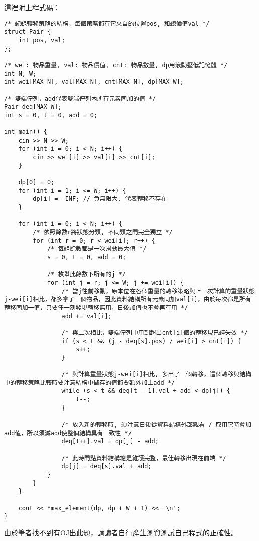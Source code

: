 這裡附上程式碼：
\begin{lstlisting}[caption=多重背包的程式碼]
/* 紀錄轉移策略的結構，每個策略都有它來自的位置pos, 和總價值val */
struct Pair {
	int pos, val;
};

/* wei: 物品重量, val: 物品價值, cnt: 物品數量, dp用滾動壓低記憶體 */
int N, W;
int wei[MAX_N], val[MAX_N], cnt[MAX_N], dp[MAX_W];

/* 雙端佇列，add代表雙端佇列內所有元素同加的值 */
Pair deq[MAX_W];
int s = 0, t = 0, add = 0;

int main() {
	cin >> N >> W;
	for (int i = 0; i < N; i++) {
		cin >> wei[i] >> val[i] >> cnt[i];
	}

	dp[0] = 0;
	for (int i = 1; i <= W; i++) {
		dp[i] = -INF; // 負無限大, 代表轉移不存在
	}

	for (int i = 0; i < N; i++) {
		/* 依照餘數r將狀態分類, 不同類之間完全獨立 */
		for (int r = 0; r < wei[i]; r++) {
			/* 每組餘數都是一次滑動最大值 */
			s = 0, t = 0, add = 0;

			/* 枚舉此餘數下所有的j */
			for (int j = r; j <= W; j += wei[i]) {
				/* 當j往前移動，原本位在各個重量的轉移策略與上一次計算的重量狀態j-wei[i]相比，都多拿了一個物品，因此資料結構所有元素同加val[i]，由於每次都是所有轉移同加一值，只要任一刻發現轉移無用，日後加值也不會再有用 */
				add += val[i];

				/* 與上次相比，雙端佇列中用到超出cnt[i]個的轉移現已經失效 */
				if (s < t && (j - deq[s].pos) / wei[i] > cnt[i]) {
					s++;
				}

				/* 與計算重量狀態j-wei[i]相比, 多出了一個轉移，這個轉移與結構中的轉移策略比較時要注意結構中儲存的值都要額外加上add */
				while (s < t && deq[t - 1].val + add < dp[j]) {
					t--;
				}

				/* 放入新的轉移時, 須注意日後從資料結構外部觀看 / 取用它時會加add值，所以須減add使整個結構具有一致性 */
				deq[t++].val = dp[j] - add;

				/* 此時間點資料結構總是維護完整，最佳轉移出現在前端 */
				dp[j] = deq[s].val + add;
			}
		}
	}

	cout << *max_element(dp, dp + W + 1) << '\n';
}
\end{lstlisting}
由於筆者找不到有OJ出此題，請讀者自行產生測資測試自己程式的正確性。

